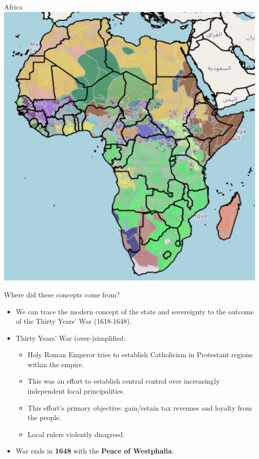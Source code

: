 \documentclass[handout]{beamer}
\begin{document}
\begin{frame}{\LARGE Africa}
    \centering
\includegraphics[width=\textwidth,height=0.8\textheight,keepaspectratio]{Africa.JPG}
\end{frame}

\begin{frame}{\LARGE Where did these concepts come from?}
\begin{itemize}
    \item We can trace the modern concept of the state and sovereignty to the outcome of the Thirty Years' War (1618-1648).  \pause
    \item Thirty Years' War (over-)simplified:
    \begin{itemize}
    	\item Holy Roman Emperor tries to establish Catholicism in Protestant regions within the empire.  \pause
    	\item This was an effort to establish central control over increasingly independent local principalities.  \pause 
    	\item This effort's primary objective: gain/retain tax revenues and loyalty from the people.  \pause
    	\item Local rulers violently disagreed.
    \end{itemize}
    \item War ends in \textbf{1648} with the \textbf{Peace of Westphalia}.
\end{itemize}
    
\end{frame}
\end{document}
